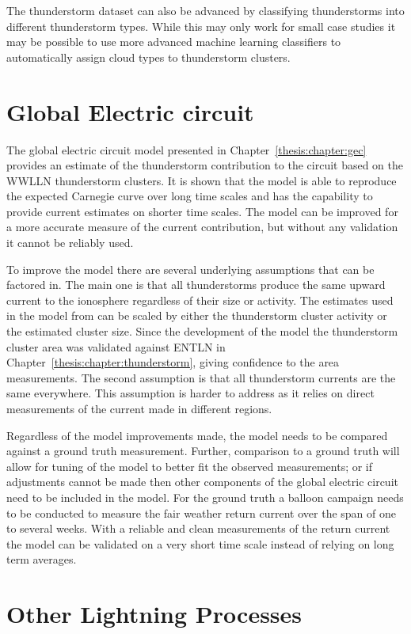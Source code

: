 The thunderstorm dataset can also be advanced by classifying thunderstorms into different thunderstorm types.
While this may only work for small case studies it may be possible to use more advanced machine learning classifiers to automatically assign cloud types to thunderstorm clusters.

\section{Global Electric circuit}

The global electric circuit model presented in Chapter~\ref{thesis:chapter:gec} provides an estimate of the thunderstorm contribution to the circuit based on the WWLLN thunderstorm clusters.
It is shown that the model is able to reproduce the expected Carnegie curve over long time scales and has the capability to provide current estimates on shorter time scales.
The model can be improved for a more accurate measure of the current contribution, but without any validation it cannot be reliably used.

To improve the model there are several underlying assumptions that can be factored in.
The main one is that all thunderstorms produce the same upward current to the ionosphere regardless of their size or activity.
The estimates used in the model from \citet{Mach2010} can be scaled by either the thunderstorm cluster activity or the estimated cluster size.
Since the development of the model the thunderstorm cluster area was validated against ENTLN in Chapter~\ref{thesis:chapter:thunderstorm}, giving confidence to the area measurements.
The second assumption is that all thunderstorm currents are the same everywhere.
This assumption is harder to address as it relies on direct measurements of the current made in different regions.

Regardless of the model improvements made, the model needs to be compared against a ground truth measurement.
Further, comparison to a ground truth will allow for tuning of the model to better fit the observed measurements; or if adjustments cannot be made then other components of the global electric circuit need to be included in the model.
For the ground truth a balloon campaign needs to be conducted to measure the fair weather return current over the span of one to several weeks.
With a reliable and clean measurements of the return current the model can be validated on a very short time scale instead of relying on long term averages.

\section{Other Lightning Processes}

